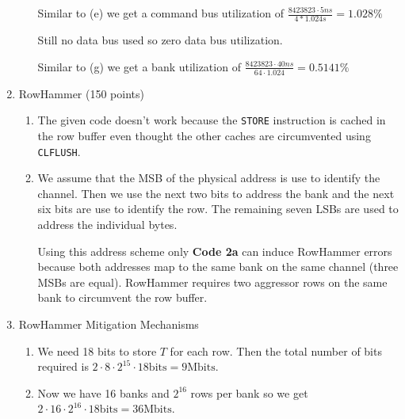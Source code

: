 \documentclass[a4paper]{article}
\begin{document}
\begin{enumerate}
\begin{enumerate}
                Similar to (e) we get a command bus utilization of $\frac{8423823\cdot5ns}{4*1.024s}=1.028\%$

                Still no data bus used so zero data bus utilization.

                Similar to (g) we get a bank utilization of $\frac{8423823\cdot40ns}{64\cdot1.024}=
                0.5141\%$
        \end{enumerate}
    \item RowHammer (150 points)
        \begin{enumerate}
            \item The given code doesn't work because the \verb|STORE| instruction is cached in
                the row buffer even thought the other caches are circumvented using \verb|CLFLUSH|.

            \item We assume that the MSB of the physical address is use to identify the channel. Then
                we use the next two bits to address the bank and the next six bits are use to identify
                the row. The remaining seven LSBs are used to address the individual bytes.

                Using this address scheme only \textbf{Code 2a} can induce RowHammer errors because both 
                addresses map to the same bank on the same channel (three MSBs are equal). RowHammer 
                requires two aggressor rows on the same bank to circumvent the row buffer.
        \end{enumerate}
    \item RowHammer Mitigation Mechanisms
        \begin{enumerate}
            \item We need 18 bits to store $T$ for each row. Then the total number of bits required
                is $2 \cdot 8 \cdot 2^{15} \cdot 18 \mathrm{bits} = 9 \mathrm{Mbits}$.
            
            \item Now we have 16 banks and $2^{16}$ rows per bank so we get
                $2 \cdot 16 \cdot 2^{16} \cdot 18 \mathrm{bits} = 36 \mathrm{Mbits}$.
            

\end{enumerate}
\end{enumerate}
\end{document}
